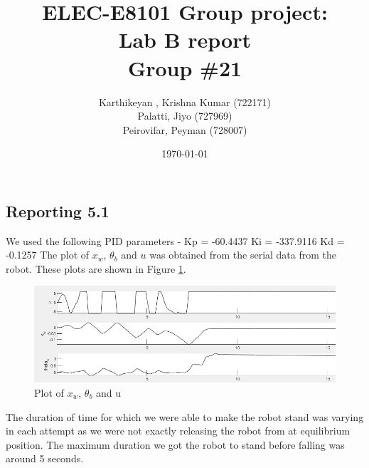 \documentclass[11pt]{article}
\title{\Huge ELEC-E8101 Group project: \\ Lab B report \\ Group \#21}
\date{\today}
\author{
Karthikeyan , Krishna Kumar (722171)\\
\newline
Palatti, Jiyo (727969)\\
\newline
Peirovifar, Peyman (728007)\\
\newline
}
\begin{document}
\maketitle

\subsection*{Reporting 5.1}
\begin{par}
	We used the following PID parameters - 
	Kp = -60.4437
	Ki = -337.9116
	Kd = -0.1257
	\newline
	The plot of $x_w$, $\theta_b$ and $u$ was obtained from the serial data from the robot. These plots are shown in Figure \ref{fig:plot1}.
\begin{figure}[ht]
	\centering
	\includegraphics[width=0.7\linewidth]{Images/report51.png}
	\caption{Plot of $x_w$, $\theta_b$ and u}
	\label{fig:plot1}
\end{figure}
\newline
The duration of time for which we were able to make the robot stand was varying in each attempt as we were not exactly releasing the robot from at equilibrium position. The maximum duration we got the robot to stand before falling was around 5 seconds.


\end{par}
\end{document}
